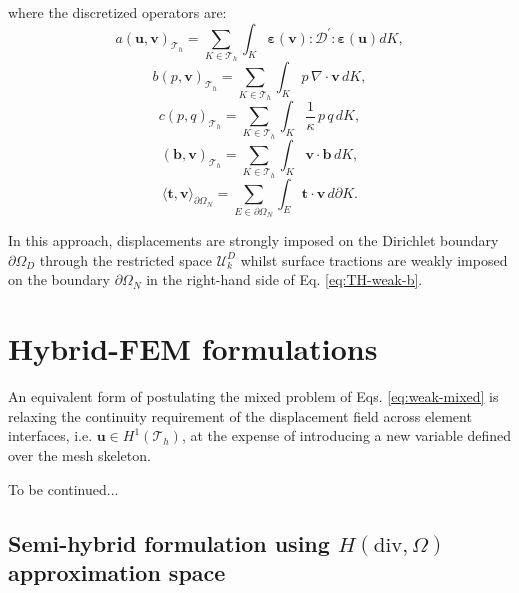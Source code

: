 \documentclass[english,11pt,3p,number,sort&compress]{elsarticle}
\newcommand{\giovane}{\color{red}{\bf\Large GA} \color{cyan} }
\begin{document}
\noindent where the discretized operators are:
\begin{equation*}
	a\left(\bm{u},\bm{v}\right)_{\mathcal{T}_h} = \sum_{K \in \mathcal{T}_h} \int_{K} \bm{\varepsilon}(\bm{v}) : \mathcal{D}^{'} : \bm{\varepsilon}(\bm{u}) dK ,
\end{equation*}
\begin{equation*}
	b\left(p, \bm{v}\right)_{\mathcal{T}_h} = \sum_{K \in \mathcal{T}_h} \int_{K} p \,\nabla \cdot \bm{v} \, dK ,
\end{equation*}
\begin{equation*}
	c\left(p,q \right)_{\mathcal{T}_h} = \sum_{K \in \mathcal{T}_h} \int_{K} \frac{1}{\kappa} \,p \,q \, dK ,
\end{equation*}
\begin{equation*}
	\left(\bm{b},\bm{v}\right)_{\mathcal{T}_h} = \sum_{K \in \mathcal{T}_h} \int_{K} \bm{v} \cdot \bm{b} \, dK ,
\end{equation*}
\begin{equation*}
	\langle\bm{t},\bm{v}\rangle_{\partial\Omega_N} = \sum_{E \in \partial\Omega_N} \int_{E} \bm{t} \cdot \bm{v} \, d\partial K .
\end{equation*}

In this approach, displacements are strongly imposed on the Dirichlet boundary $\partial \Omega_D$ through the restricted space $\mathcal{U}^D_k$ whilst surface tractions are weakly imposed on the boundary $\partial \Omega_N$ in the right-hand side of Eq. \eqref{eq:TH-weak-b}.

\section{Hybrid-FEM formulations}

An equivalent form of postulating the mixed problem of Eqs. \eqref{eq:weak-mixed} is relaxing the continuity requirement of the displacement field across element interfaces, i.e. $\bm{u} \in H^1(\mathcal{T}_h)$, at the expense of introducing a new variable defined over the mesh skeleton.

{\giovane To be continued...}

\subsection{Semi-hybrid formulation using \(H(\text{div},\Omega)\) approximation space}
\end{document}
